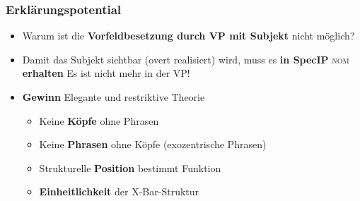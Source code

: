 \begin{frame}
\frametitle{Erklärungspotential}


\begin{itemize}
	\item Warum ist die \textbf{Vorfeldbesetzung durch VP mit Subjekt} nicht möglich?
	\eal 
	\zl

\pause
	\item Damit das Subjekt sichtbar (overt realisiert) wird, muss es \textbf{in SpecIP} \textsc{nom} \textbf{erhalten} \ras Es ist nicht mehr in der VP!

\end{itemize}		

\pause
\begin{itemize}
	\item \textbf{Gewinn} \ras Elegante und restriktive Theorie \nocite{Haspelmath94a}
	\begin{itemize}
		\item Keine \textbf{Köpfe} ohne Phrasen
		\item Keine \textbf{Phrasen} ohne Köpfe (exozentrische Phrasen)
		\item Strukturelle \textbf{Position} bestimmt Funktion
		\item \textbf{Einheitlichkeit} der X-Bar-Struktur
	\end{itemize}		

\end{itemize}

\end{frame}


